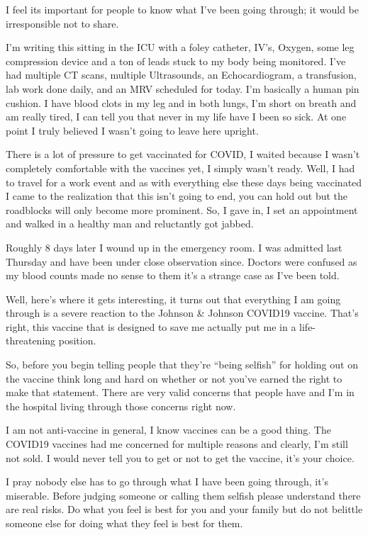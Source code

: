 I feel its important for people to know what I’ve been going through; it would
be irresponsible not to share.

I’m writing this sitting in the ICU with a foley catheter, IV’s, Oxygen, some
leg compression device and a ton of leads stuck to my body being monitored. I’ve
had multiple CT scans, multiple Ultrasounds, an Echocardiogram, a transfusion,
lab work done daily, and an MRV scheduled for today. I’m basically a human pin
cushion. I have blood clots in my leg and in both lungs, I’m short on breath and
am really tired, I can tell you that never in my life have I been so sick. At
one point I truly believed I wasn’t going to leave here upright.

There is a lot of pressure to get vaccinated for COVID, I waited because I
wasn’t completely comfortable with the vaccines yet, I simply wasn’t
ready. Well, I had to travel for a work event and as with everything else these
days being vaccinated I came to the realization that this isn’t going to end,
you can hold out but the roadblocks will only become more prominent. So, I gave
in, I set an appointment and walked in a healthy man and reluctantly got jabbed.

Roughly 8 days later I wound up in the emergency room. I was admitted last
Thursday and have been under close observation since. Doctors were confused as
my blood counts made no sense to them it’s a strange case as I’ve been told.

Well, here’s where it gets interesting, it turns out that everything I am going
through is a severe reaction to the Johnson \& Johnson COVID19 vaccine. That’s
right, this vaccine that is designed to save me actually put me in a
life-threatening position.

So, before you begin telling people that they’re “being selfish” for holding out
on the vaccine think long and hard on whether or not you’ve earned the right to
make that statement. There are very valid concerns that people have and I’m in
the hospital living through those concerns right now.

I am not anti-vaccine in general, I know vaccines can be a good thing. The
COVID19 vaccines had me concerned for multiple reasons and clearly, I’m still
not sold. I would never tell you to get or not to get the vaccine, it’s your
choice.

I pray nobody else has to go through what I have been going through, it’s
miserable. Before judging someone or calling them selfish please understand
there are real risks. Do what you feel is best for you and your family but do
not belittle someone else for doing what they feel is best for them.
